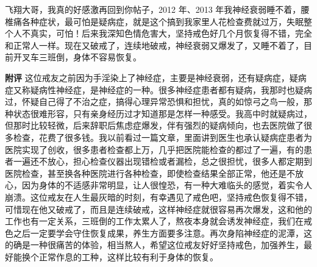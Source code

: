 \begin{case}
    飞翔大哥，我真的好感激再回到你帖子，2012 年、2013 年我神经衰弱睡不着，腰椎痛各种症状，最可怕是疑病症，就是这个搞到我家里人花检查费就过万，失眠整个人不真实，可怕！后来我深知色情危害大，坚持戒色好几个月恢复得不错，完全和正常人一样。现在又破戒了，连续地破戒，神经衰弱又爆发了，又睡不着了，目前开叉车三班倒，身体不容易恢复。

    \textbf{附评} 这位戒友之前因为手淫染上了神经症，主要是神经衰弱，还有疑病症，疑病症又称疑病性神经症，是神经症的一种。很多神经症患者都有疑病，我那时也疑病过，怀疑自己得了不治之症，搞得心理异常恐惧和担忧，真的如惊弓之鸟一般，那种状态很难形容，只有亲身经历过才知道那是怎样一种感受。我高中时就疑病过，但那时比较轻微，后来辞职后焦虑症爆发，伴有强烈的疑病倾向，也去医院做了很多检查，花费了很多钱。我以前看过一篇文章，里面讲到医生也承认疑病症患者为医院实现了创收，很多患者检查都上万，几乎把医院能检查的都过了一遍，有的患者一遍还不放心，担心检查仪器出现错检或者漏检，总之很担忧，很多人都定期到医院检查，甚至换各种医院进行各种检查，即使检查结果全部正常，他还是不放心，因为身体的不适感非常明显，让人很惶恐，有一种大难临头的感觉，着实令人崩溃。这位戒友在人生最灰暗的时刻，有幸遇见了戒色吧，坚持戒色恢复得不错，可惜现在他又破戒了，而且是连续破戒，这样神经症就很容易再次爆发，这和他的工作也有一定关系，三班倒的工作太累人了，熬夜本身就会诱发神经症，我们在戒色之后一定要学会守住恢复成果，养生方面要多注意。再次身陷神经症的泥潭，这的确是一种很痛苦的体验，相当熬人，希望这位戒友好好坚持戒色，加强养生，最好能换个正常作息的工种，这样比较有利于身体的恢复。
\end{case}

